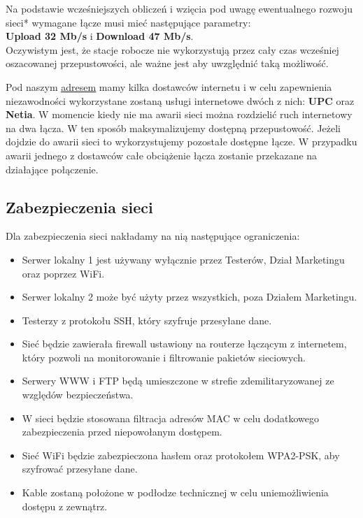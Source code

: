 \documentclass[a4paper,12pt]{extarticle}  %
\begin{document}
Na podstawie wcześniejszych obliczeń i wzięcia pod uwagę
ewentualnego rozwoju sieci* wymagane łącze musi mieć
następujące parametry:\\

\textbf{Upload 32 Mb/s} i \textbf{Download 47 Mb/s}.\\

Oczywistym jest, że stacje robocze nie wykorzystują przez
cały czas wcześniej oszacowanej przepustowości,
ale ważne jest aby uwzględnić taką możliwość.

Pod naszym \underline{\href{address}{adresem}} mamy kilka dostawców internetu i
w celu zapewnienia niezawodności wykorzystane zostaną
usługi internetowe dwóch z nich:
\textbf{UPC} oraz \textbf{Netia}.
W momencie kiedy nie ma awarii sieci można rozdzielić
ruch internetowy na dwa łącza.  W ten sposób maksymalizujemy
dostępną przepustowość. Jeżeli dojdzie do awarii sieci to
wykorzystujemy pozostałe dostępne łącze. W przypadku awarii jednego z dostawców całe obciążenie łącza
zostanie przekazane na działające połączenie.
\subsection{Zabezpieczenia sieci}
Dla zabezpieczenia sieci nakładamy na nią następujące ograniczenia:
\begin{itemize}
	\item Serwer lokalny 1 jest używany wyłącznie przez Testerów, Dział Marketingu oraz poprzez WiFi.
	\item Serwer lokalny 2 może być użyty przez wszystkich, poza Działem Marketingu.
	\item Testerzy z protokołu SSH, który szyfruje przesyłane dane.
	\item Sieć będzie zawierała firewall ustawiony na routerze łączącym z internetem, który pozwoli na monitorowanie i filtrowanie pakietów sieciowych.
	\item Serwery WWW i FTP będą umieszczone w strefie zdemilitaryzowanej ze względów bezpieczeństwa.
	\item W sieci będzie stosowana filtracja adresów MAC w celu dodatkowego zabezpieczenia przed niepowołanym dostępem.
	\item Sieć WiFi będzie zabezpieczona hasłem oraz protokołem WPA2-PSK, aby szyfrować przesyłane dane.
	\item Kable zostaną położone w podłodze technicznej w celu uniemożliwienia dostępu z zewnątrz.
\end{itemize}
\end{document}
